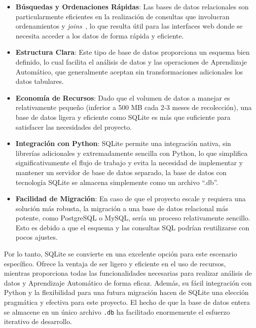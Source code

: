 \begin{itemize}
\item \textbf{Búsquedas y Ordenaciones Rápidas}: Las bases de datos relacionales son particularmente eficientes en la realización de consultas que involucran ordenamientos y \textit{joins}~\cite{garba2020}, lo que resulta útil para las interfaces web donde se necesita acceder a los datos de forma rápida y eficiente.

\item \textbf{Estructura Clara}: Este tipo de base de datos proporciona un esquema bien definido, lo cual facilita el análisis de datos y las operaciones de Aprendizaje Automático, que generalmente aceptan sin transformaciones adicionales los datos tabulares.

\item \textbf{Economía de Recursos}: Dado que el volumen de datos a manejar es relativamente pequeño (inferior a 500 MB cada 2-3 meses de recolección), una base de datos ligera y eficiente como SQLite es más que suficiente para satisfacer las necesidades del proyecto.

\item \textbf{Integración con Python}: SQLite permite una integración nativa, sin librerías adicionales y extremadamente sencilla con Python, lo que simplifica significativamente el flujo de trabajo y evita la necesidad de implementar y mantener un servidor de base de datos separado, la base de datos con tecnología SQLite se almacena simplemente como un archivo ``.db''.

\item \textbf{Facilidad de Migración}: En caso de que el proyecto escale y requiera una solución más robusta, la migración a una base de datos relacional más potente, como PostgreSQL o MySQL, sería un proceso relativamente sencillo. Esto es debido a que el esquema y las consultas SQL podrían reutilizarse con pocos ajustes.
\end{itemize}

Por lo tanto, SQLite se convierte en una excelente opción para este escenario específico. Ofrece la ventaja de ser ligero y eficiente en el uso de recursos, mientras proporciona todas las funcionalidades necesarias para realizar análisis de datos y Aprendizaje Automático de forma eficaz. Además, su fácil integración con Python y la flexibilidad para una futura migración hacen de SQLite una elección pragmática y efectiva para este proyecto. El hecho de que la base de datos entera se almacene en un único archivo \texttt{.db} ha facilitado enormemente el esfuerzo iterativo de desarrollo. 

